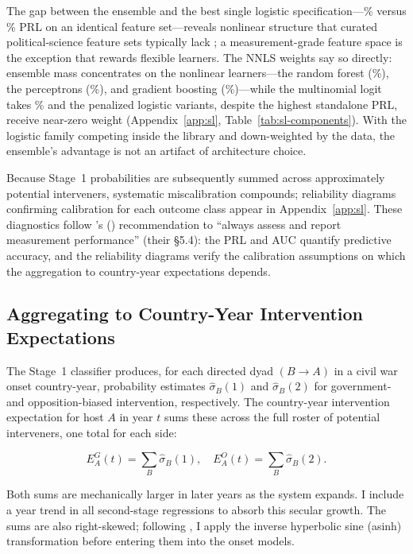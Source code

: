 The gap between the ensemble and the best single logistic
specification---\SLprl\% versus \BestLogitPRL\% PRL on an identical feature
set---reveals nonlinear structure that curated political-science feature
sets typically lack \citep{moruccispirling2024}; a measurement-grade feature
space is the exception that rewards flexible learners.  The NNLS weights say
so directly: ensemble mass concentrates on the nonlinear learners---the random
forest (\WtRF\%), the perceptrons (\WtMLP\%), and gradient boosting
(\WtHGB\%)---while the multinomial logit takes \WtMultinom\% and the penalized
logistic variants, despite the highest standalone PRL, receive near-zero
weight (Appendix~\ref{app:sl}, Table~\ref{tab:sl-components}).  With the
logistic family competing inside the library and down-weighted by the data,
the ensemble's advantage is not an artifact of architecture choice.

Because Stage~1 probabilities are subsequently summed across approximately
\NumInterveners{} potential interveners, systematic miscalibration compounds; reliability
diagrams confirming calibration for each outcome class appear in Appendix~\ref{app:sl}.
These diagnostics follow \citeauthor{knoxlucascho2022}'s (\citeyear{knoxlucascho2022}) recommendation to ``always
assess and report measurement performance'' (their \S5.4): the PRL and AUC
quantify predictive accuracy, and the reliability diagrams verify the
calibration assumptions on which the aggregation to country-year
expectations depends.

\subsection{Aggregating to Country-Year Intervention Expectations}

The Stage~1 classifier produces, for each directed dyad $(B \rightarrow A)$
in a civil war onset country-year, probability estimates
$\hat{\sigma}_B(1)$ and $\hat{\sigma}_B(2)$ for government- and
opposition-biased intervention, respectively.  The country-year
intervention expectation for host $A$ in year $t$ sums these across the
full roster of potential interveners, one total for each side:

\begin{equation*}
E_A^G(t) = \sum_{B} \hat{\sigma}_B(1), \quad
E_A^O(t) = \sum_{B} \hat{\sigma}_B(2).
\end{equation*}

Both sums are mechanically larger in later years as the system expands.
I include a year trend in all second-stage regressions to absorb this
secular growth.  The sums are also right-skewed; following
\citet{burbidge1988}, I apply the inverse hyperbolic sine (asinh)
transformation before entering them into the onset models.

